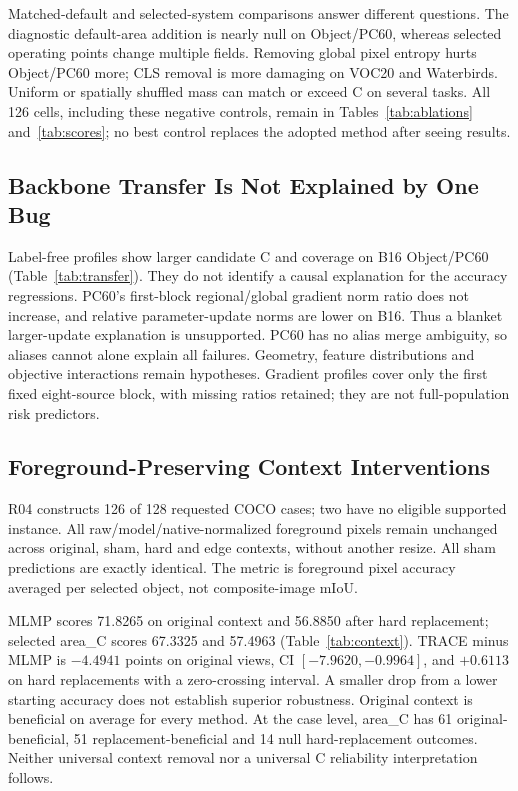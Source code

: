 \documentclass[10pt,twocolumn]{article}
\begin{document}
Matched-default and selected-system comparisons answer different questions.
The diagnostic default-area addition is nearly null on Object/PC60, whereas
selected operating points change multiple fields. Removing global pixel
entropy hurts Object/PC60 more; CLS removal is more damaging on VOC20 and
Waterbirds. Uniform or spatially shuffled mass can match or exceed C on
several tasks. All 126 cells, including these negative controls, remain in
Tables~\ref{tab:ablations} and~\ref{tab:scores}; no best control replaces the
adopted method after seeing results.

\subsection{Backbone Transfer Is Not Explained by One Bug}
Label-free profiles show larger candidate C and coverage on B16 Object/PC60
(Table~\ref{tab:transfer}). They do not identify a causal explanation for the
accuracy regressions. PC60's first-block regional/global gradient norm ratio
does not increase, and relative parameter-update norms are lower on B16.
Thus a blanket larger-update explanation is unsupported. PC60 has no alias
merge ambiguity, so aliases cannot alone explain all failures. Geometry,
feature distributions and objective interactions remain hypotheses. Gradient
profiles cover only the first fixed eight-source block, with missing ratios
retained; they are not full-population risk predictors.

\subsection{Foreground-Preserving Context Interventions}
R04 constructs 126 of 128 requested COCO cases; two have no eligible supported
instance. All raw/model/native-normalized foreground pixels remain unchanged
across original, sham, hard and edge contexts, without another resize. All
sham predictions are exactly identical. The metric is foreground pixel
accuracy averaged per selected object, not composite-image mIoU.

MLMP scores 71.8265 on original context and 56.8850 after hard replacement;
selected area\_C scores 67.3325 and 57.4963 (Table~\ref{tab:context}). TRACE
minus MLMP is $-4.4941$ points on original views, CI $[-7.9620,-0.9964]$,
and $+0.6113$ on hard replacements with a zero-crossing interval. A smaller
drop from a lower starting accuracy does not establish superior robustness.
Original context is beneficial on average for every method. At the case
level, area\_C has 61 original-beneficial, 51 replacement-beneficial and 14
null hard-replacement outcomes. Neither universal context removal nor a
universal C reliability interpretation follows.
\end{document}
